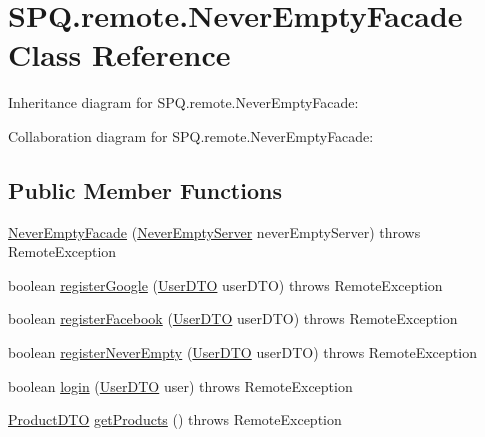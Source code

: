 \hypertarget{class_s_p_q_1_1remote_1_1_never_empty_facade}{}\section{S\+P\+Q.\+remote.\+Never\+Empty\+Facade Class Reference}
\label{class_s_p_q_1_1remote_1_1_never_empty_facade}


Inheritance diagram for S\+P\+Q.\+remote.\+Never\+Empty\+Facade\+:


Collaboration diagram for S\+P\+Q.\+remote.\+Never\+Empty\+Facade\+:
\subsection*{Public Member Functions}
\begin{DoxyCompactItemize}
\item 
\mbox{\hyperlink{class_s_p_q_1_1remote_1_1_never_empty_facade_afc6e9b52fbed599fb3f152533d2bedea}{Never\+Empty\+Facade}} (\mbox{\hyperlink{class_s_p_q_1_1_never_empty_server}{Never\+Empty\+Server}} never\+Empty\+Server)  throws Remote\+Exception 
\item 
boolean \mbox{\hyperlink{class_s_p_q_1_1remote_1_1_never_empty_facade_aaa8d4a6148957029af068d00da24890b}{register\+Google}} (\mbox{\hyperlink{class_s_p_q_1_1dto_1_1_user_d_t_o}{User\+D\+TO}} user\+D\+TO)  throws Remote\+Exception 
\item 
boolean \mbox{\hyperlink{class_s_p_q_1_1remote_1_1_never_empty_facade_aa9845001ecd5228135d64415a4c12b20}{register\+Facebook}} (\mbox{\hyperlink{class_s_p_q_1_1dto_1_1_user_d_t_o}{User\+D\+TO}} user\+D\+TO)  throws Remote\+Exception 
\item 
boolean \mbox{\hyperlink{class_s_p_q_1_1remote_1_1_never_empty_facade_a52a0feff1dfb3347e55e46c3ac48fafc}{register\+Never\+Empty}} (\mbox{\hyperlink{class_s_p_q_1_1dto_1_1_user_d_t_o}{User\+D\+TO}} user\+D\+TO)  throws Remote\+Exception 
\item 
boolean \mbox{\hyperlink{class_s_p_q_1_1remote_1_1_never_empty_facade_a3fdd96efa1256ea520a497b8a20578e8}{login}} (\mbox{\hyperlink{class_s_p_q_1_1dto_1_1_user_d_t_o}{User\+D\+TO}} user)  throws Remote\+Exception 
\item 
\mbox{\hyperlink{class_s_p_q_1_1dto_1_1_product_d_t_o}{Product\+D\+TO}} \mbox{\hyperlink{class_s_p_q_1_1remote_1_1_never_empty_facade_a4c8bdeeb3d2c3eb2c28aec1043e9274f}{get\+Products}} ()  throws Remote\+Exception 
\item 

\end{DoxyCompactItemize}

